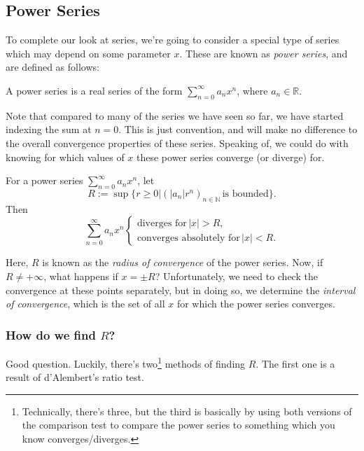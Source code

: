 \documentclass[
  12pt,
  a4paper]{extarticle}
\theoremstyle{plain}
\theoremstyle{plain}
\theoremstyle{plain}
\theoremstyle{plain}
\theoremstyle{plain}
\theoremstyle{definition}
\theoremstyle{definition}
\theoremstyle{definition}
\theoremstyle{remark}
\let\BeginKnitrBlock\begin \let\EndKnitrBlock\end
\renewcommand{\;}{\,}
\begin{document}
\hypertarget{power-series}{%
\subsection{Power Series}\label{power-series}}

To complete our look at series, we're going to consider a special type of series which may depend on some parameter \(x\). These are known as \emph{power series}, and are defined as follows:

\BeginKnitrBlock{definition}[Power Series]
{\label{def:def1} }A power series is a real series of the form \(\sum_{n = 0}^{\infty} a_n x^n\), where \(a_n \in \mathbb{R}\).
\EndKnitrBlock{definition}
Note that compared to many of the series we have seen so far, we have started indexing the sum at \(n = 0\). This is just convention, and will make no difference to the overall convergence properties of these series. Speaking of, we could do with knowing for which values of \(x\) these power series converge (or diverge) for.

\BeginKnitrBlock{proposition}
{\label{prp:prop1} }For a power series \(\sum_{n = 0}^{\infty} a_n x^n\), let \[R:= \sup\lbrace r \geq 0 \lvert \left(\lvert a_n \rvert r^n\right)_{n \in \mathbb{N}} \; \text{is bounded}\rbrace.\] Then \[\sum_{n = 0}^{\infty} a_n x^n \begin{cases}
\text{diverges for}\;\lvert x \rvert > R,\\
\text{converges absolutely for}\; \lvert x \rvert < R. 
\end{cases}\]
\EndKnitrBlock{proposition}
Here, \(R\) is known as the \emph{radius of convergence} of the power series. Now, if \(R \neq +\infty\), what happens if \(x = \pm R\)? Unfortunately, we need to check the convergence at these points separately, but in doing so, we determine the \emph{interval of convergence}, which is the set of all \(x\) for which the power series converges.

\hypertarget{how-do-we-find-r}{%
\subsubsection{\texorpdfstring{How do we find \(R\)?}{How do we find R?}}\label{how-do-we-find-r}}

Good question. Luckily, there's two\footnote{Technically, there's three, but the third is basically by using both versions of the comparison test to compare the power series to something which you know converges/diverges.} methods of finding \(R\). The first one is a result of d'Alembert's ratio test.
\end{document}
